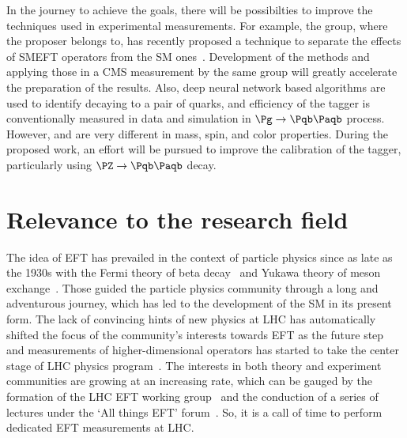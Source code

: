 \documentclass[a4paper,11pt]{article}
\newcommand{\Pb}{{{\Pqb}}\xspace}
\newcommand{\PAb}{{{{\Paqb}}}\xspace}
\begin{document}
In the journey to achieve the goals, there will be possibilties to improve the techniques used in experimental measurements. 
For example, the group, where the proposer belongs to, has recently proposed a technique to separate the effects of SMEFT operators from the SM ones~\cite{Chatterjee:2021nms}.
Development of the methods and applying those in a CMS measurement by the same group will greatly accelerate the preparation of the results. 
Also, deep neural network based algorithms are used to identify \PH decaying to a pair of \Pb quarks, and efficiency of the tagger is conventionally measured in data and simulation in $\Pg \to \Pb \PAb$ process. However, \Pg and \PH are very different in mass, spin, and color properties. During the proposed work, an effort will be pursued to improve the calibration of the tagger, 
particularly using $\PZ \to \Pb \PAb$ decay.


\section{Relevance to the research field}

The idea of EFT has prevailed in the context of particle physics since as late as the 1930s with the Fermi theory of beta decay~\cite{Fermi:1934hr} and Yukawa theory of meson exchange~\cite{Yukawa:1935xg}.
Those guided the particle physics community through a long and adventurous journey, 
which has led to the development of the SM in its present form. 
The lack of convincing hints of new physics at LHC has automatically shifted the focus of the community's interests towards EFT as the future step~\cite{Ellis:2018gqa,Ellis:2020unq,Ethier:2021bye} 
and measurements of higher-dimensional operators has started to take the center stage of LHC physics program~\cite{CMS:2021nnc,CMS:2021aly,CMS:2021gme}.
The interests in both theory and experiment communities are growing at an increasing rate, 
which can be gauged by the formation of the LHC EFT working group~\cite{LHC_EFT_WG} and the conduction of a series of lectures under the `All things EFT' forum~\cite{All_EFT}. 
So, it is a call of time to perform dedicated EFT measurements at LHC.
\end{document}
